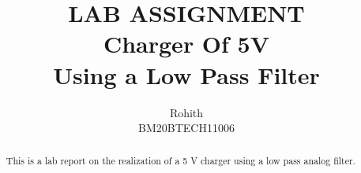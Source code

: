 \documentclass[journal,12pt,twocolumn]{IEEEtran}
\begin{document}
\let\StandardTheFigure\thefigure
\renewcommand{\thefigure}{\arabic{section}.\arabic{figure}}
\makeatletter
{}
\makeatother
\def\putbox#1#2#3{\makebox[0in][l]{\makebox[#1][l]{}\raisebox{\baselineskip}[0in][0in]{\raisebox{#2}[0in][0in]{#3}}}}
     \def\rightbox#1{\makebox[0in][r]{#1}}
     \def\centbox#1{\makebox[0in]{#1}}
     \def\topbox#1{\raisebox{-\baselineskip}[0in][0in]{#1}}
     \def\midbox#1{\raisebox{-0.5\baselineskip}[0in][0in]{#1}}
\vspace{3cm}
\title{LAB ASSIGNMENT\\Charger Of 5V\\ Using a Low Pass Filter}
\author{Rohith \\BM20BTECH11006}
\maketitle
\tableofcontents
\renewcommand{\thetable}{\theenumi}
\bigskip
\begin{abstract}
    This is a lab report on the realization of a 5 V charger using
    a low pass analog filter.
\end{abstract}
\end{document}

